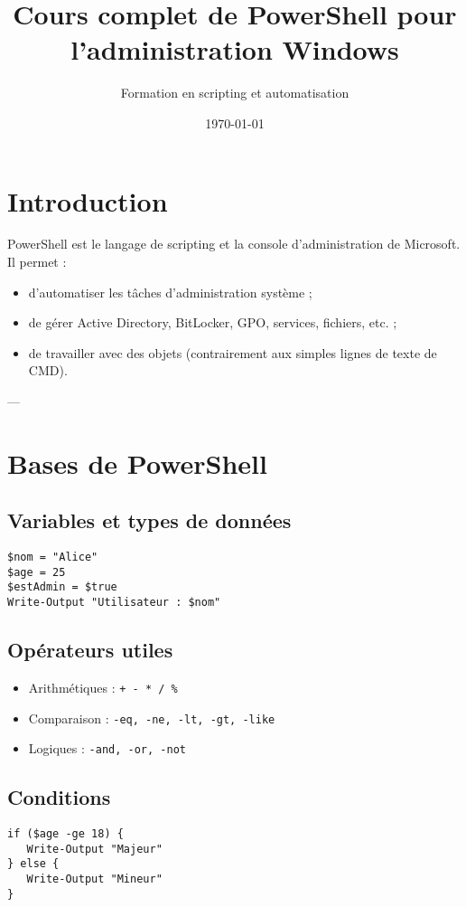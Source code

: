 \documentclass[a4paper,12pt]{article}
\title{Cours complet de PowerShell pour l'administration Windows}
\author{Formation en scripting et automatisation}
\date{\today}
\begin{document}
\maketitle
\tableofcontents
\newpage

\section{Introduction}
\begin{tcolorbox}[colback=blue!5!white,colframe=blue!75!black,title=Pourquoi PowerShell ?]
PowerShell est le langage de scripting et la console d’administration de Microsoft.  
Il permet :
\begin{itemize}
  \item d’automatiser les tâches d’administration système ;
  \item de gérer Active Directory, BitLocker, GPO, services, fichiers, etc. ;
  \item de travailler avec des objets (contrairement aux simples lignes de texte de CMD).
\end{itemize}
\end{tcolorbox}

---

\section{Bases de PowerShell}
\subsection{Variables et types de données}
\begin{verbatim}
$nom = "Alice"
$age = 25
$estAdmin = $true
Write-Output "Utilisateur : $nom"
\end{verbatim}

\subsection{Opérateurs utiles}
\begin{itemize}
  \item Arithmétiques : \texttt{+ - * / \%}
  \item Comparaison : \texttt{-eq, -ne, -lt, -gt, -like}
  \item Logiques : \texttt{-and, -or, -not}
\end{itemize}

\subsection{Conditions}
\begin{verbatim}
if ($age -ge 18) {
   Write-Output "Majeur"
} else {
   Write-Output "Mineur"
}
\end{verbatim}
\end{document}
